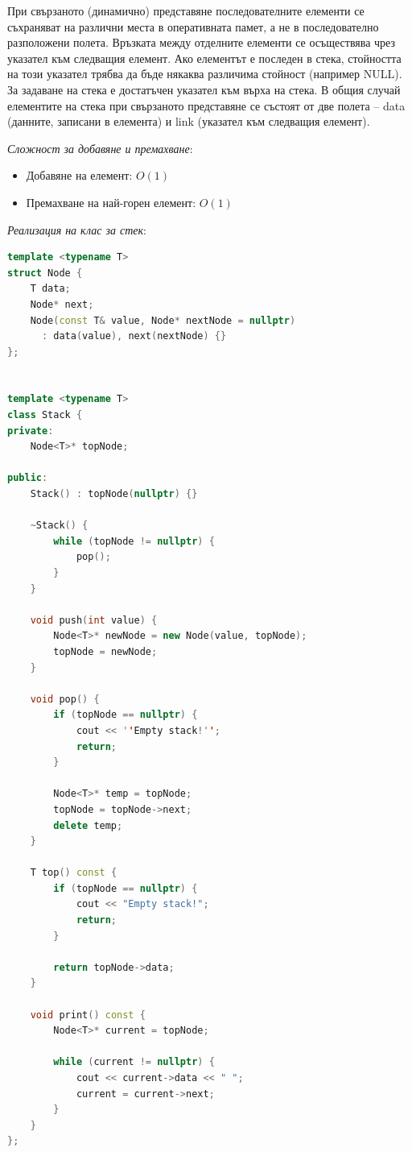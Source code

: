 \documentclass{article}
\renewcommand{\\}{\newline}
\begin{document}
При свързаното (динамично) представяне последователните елементи се съхраняват на различни места в оперативната памет, а не в последователно разположени полета. Връзката между отделните елементи се осъществява чрез указател към следващия елемент. Ако елементът е последен в стека, стойността на този указател трябва да бъде някаква различима стойност (например NULL). За задаване на стека е достатъчен указател към върха на стека. В общия случай елементите на стека при свързаното представяне се състоят от две полета – data (данните, записани в елемента) и link (указател към следващия елемент).

\textit{Сложност за добавяне и премахване}:
\begin{itemize}
    \item Добавяне на елемент: \(O(1)\) 
    \item Премахване на най-горен елемент: \(O(1)\) 
\end{itemize}

\textit{Реализация на клас за стек}:

\begin{lstlisting}[language=C++]
template <typename T>
struct Node {
    T data;
    Node* next;
    Node(const T& value, Node* nextNode = nullptr)
      : data(value), next(nextNode) {}
};


template <typename T>
class Stack {
private:
    Node<T>* topNode;

public:
    Stack() : topNode(nullptr) {}

    ~Stack() {
        while (topNode != nullptr) {
            pop();
        }
    }

    void push(int value) {
        Node<T>* newNode = new Node(value, topNode);
        topNode = newNode;
    }

    void pop() {
        if (topNode == nullptr) {
            cout << ''Empty stack!'';
            return;
        }

        Node<T>* temp = topNode;
        topNode = topNode->next;
        delete temp;
    }

    T top() const {
        if (topNode == nullptr) {
            cout << "Empty stack!";
            return;
        }

        return topNode->data;
    }

    void print() const {
        Node<T>* current = topNode;

        while (current != nullptr) {
            cout << current->data << " ";
            current = current->next;
        }
    }
};
\end{lstlisting}
\end{document}
